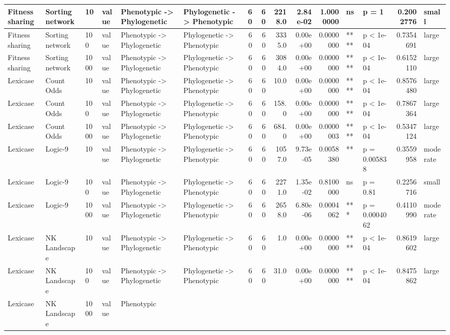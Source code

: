 \documentclass[]{book}
\begin{document}
\begin{table}
\begin{tabular}[t]{l|l|l|l|l|l|r|r|r|r|r|l|l|r|l}
\hline
Fitness sharing & Sorting network & 10 & value & Phenotypic
    ->
Phylogenetic & Phylogenetic
    ->
Phenotypic & 60 & 60 & 2218.0 & 2.84e-02 & 1.0000000 & ns & p = 1 & 0.2002776 & small\\
\hline
Fitness sharing & Sorting network & 100 & value & Phenotypic
    ->
Phylogenetic & Phylogenetic
    ->
Phenotypic & 60 & 60 & 3335.0 & 0.00e+00 & 0.0000000 & **** & p < 1e-04 & 0.7354691 & large\\
\hline
Fitness sharing & Sorting network & 1000 & value & Phenotypic
    ->
Phylogenetic & Phylogenetic
    ->
Phenotypic & 60 & 60 & 3084.0 & 0.00e+00 & 0.0000000 & **** & p < 1e-04 & 0.6152110 & large\\
\hline
Lexicase & Count Odds & 10 & value & Phenotypic
    ->
Phylogenetic & Phylogenetic
    ->
Phenotypic & 60 & 60 & 10.0 & 0.00e+00 & 0.0000000 & **** & p < 1e-04 & 0.8576480 & large\\
\hline
Lexicase & Count Odds & 100 & value & Phenotypic
    ->
Phylogenetic & Phylogenetic
    ->
Phenotypic & 60 & 60 & 158.0 & 0.00e+00 & 0.0000000 & **** & p < 1e-04 & 0.7867364 & large\\
\hline
Lexicase & Count Odds & 1000 & value & Phenotypic
    ->
Phylogenetic & Phylogenetic
    ->
Phenotypic & 60 & 60 & 684.0 & 0.00e+00 & 0.0000003 & **** & p < 1e-04 & 0.5347124 & large\\
\hline
Lexicase & Logic-9 & 10 & value & Phenotypic
    ->
Phylogenetic & Phylogenetic
    ->
Phenotypic & 60 & 60 & 1057.0 & 9.73e-05 & 0.0058380 & ** & p = 0.005838 & 0.3559958 & moderate\\
\hline
Lexicase & Logic-9 & 100 & value & Phenotypic
    ->
Phylogenetic & Phylogenetic
    ->
Phenotypic & 60 & 60 & 2271.0 & 1.35e-02 & 0.8100000 & ns & p = 0.81 & 0.2256716 & small\\
\hline
Lexicase & Logic-9 & 1000 & value & Phenotypic
    ->
Phylogenetic & Phylogenetic
    ->
Phenotypic & 60 & 60 & 2658.0 & 6.80e-06 & 0.0004062 & *** & p = 0.0004062 & 0.4110990 & moderate\\
\hline
Lexicase & NK Landscape & 10 & value & Phenotypic
    ->
Phylogenetic & Phylogenetic
    ->
Phenotypic & 60 & 60 & 1.0 & 0.00e+00 & 0.0000000 & **** & p < 1e-04 & 0.8619602 & large\\
\hline
Lexicase & NK Landscape & 100 & value & Phenotypic
    ->
Phylogenetic & Phylogenetic
    ->
Phenotypic & 60 & 60 & 31.0 & 0.00e+00 & 0.0000000 & **** & p < 1e-04 & 0.8475862 & large\\
\hline
Lexicase & NK Landscape & 1000 & value & Phenotypic

\end{tabular}
\end{table}
\end{document}
